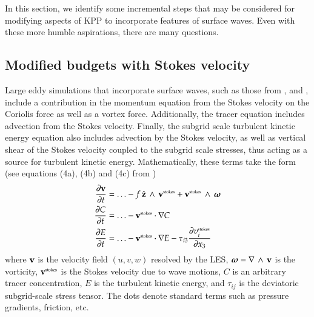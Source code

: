 In this section, we identify some incremental steps that may be
considered for modifying aspects of KPP to incorporate features of
surface waves.  Even with these more humble aspirations, there are
many questions.


\subsection{Modified budgets with Stokes velocity}
\label{subsection:stokes-into-pe-kpp}

Large eddy simulations that incorporate surface waves, such as those
from \cite{McWilliamsSullivanMoeng1997}, \cite{McWilliamsSullivan2001}
and \cite{SullivanMcWilliams07}, include a contribution in the
momentum equation from the Stokes velocity on the Coriolis force as
well as a vortex force.  Additionally, the tracer equation includes
advection from the Stokes velocity.  Finally, the subgrid scale
turbulent kinetic energy equation also includes advection by the
Stokes velocity, as well as vertical shear of the Stokes velocity
coupled to the subgrid scale stresses, thus acting as a source for
turbulent kinetic energy. Mathematically, these terms take the form
(see equations (4a), (4b) and (4c) from \cite{SullivanMcWilliams2010})
\begin{align}
\frac{\partial {\bf v}}{\partial t} &= \ldots -f \, \hat{\bf z} \, \wedge \, {\bf v}^{\mbox{\tiny stokes}}  
 + {\bf v}^{\mbox{\tiny stokes}}  \, \wedge \, \mbox{\boldmath $\omega$}
\\
\frac{\partial C}{\partial t} &= \ldots -{\bf v}^{\mbox{\tiny stokes}} \cdot \nabla C
\\
\frac{\partial E}{\partial t} &= \ldots -{\bf v}^{\mbox{\tiny stokes}} \cdot \nabla E
 - \tau_{i3} \frac{\partial v^{\mbox{\tiny stokes}}_{i}}{\partial x_{3}}
\end{align}
where ${\bf v}$ is the velocity field $(u,v,w)$ resolved by the LES,
$\mbox{\boldmath $\omega$} = \nabla \, \wedge \, {\bf v}$ is the vorticity, ${\bf
  v}^{\mbox{\tiny stokes}}$ is the Stokes velocity due to wave
motions, $C$ is an arbitrary tracer concentration, $E$ is the
turbulent kinetic energy, and $\tau_{ij}$ is the deviatoric
subgrid-scale stress tensor. The dots denote standard terms such as
pressure gradients, friction, etc.

